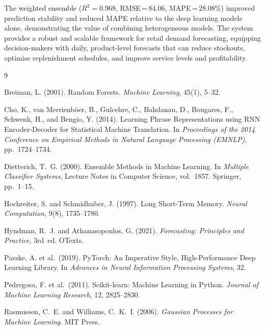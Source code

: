 \documentclass[12pt, a4paper]{article}
\begin{document}
The weighted ensemble ($R^{2} = 0.968$, RMSE\,=\,84.06, MAPE\,=\,28.08\%) improved
prediction stability and reduced MAPE relative to the deep learning models alone,
demonstrating the value of combining heterogeneous models. The system provides a robust and
scalable framework for retail demand forecasting, equipping decision-makers with daily,
product-level forecasts that can reduce stockouts, optimise replenishment schedules, and
improve service levels and profitability.

\newpage
\begin{thebibliography}{9}

Breiman, L. (2001).
Random Forests.
\textit{Machine Learning}, 45(1), 5--32.

Cho, K., van Merrienb\"{o}er, B., Gulcehre, C., Bahdanau, D., Bougares, F., Schwenk, H.,
and Bengio, Y. (2014).
Learning Phrase Representations using RNN Encoder-Decoder for Statistical Machine
Translation.
In \textit{Proceedings of the 2014 Conference on Empirical Methods in Natural Language
Processing (EMNLP)}, pp.\ 1724--1734.

Dietterich, T.~G. (2000).
Ensemble Methods in Machine Learning.
In \textit{Multiple Classifier Systems}, Lecture Notes in Computer Science, vol.\ 1857.
Springer, pp.\ 1--15.

Hochreiter, S. and Schmidhuber, J. (1997).
Long Short-Term Memory.
\textit{Neural Computation}, 9(8), 1735--1780.

Hyndman, R.~J. and Athanasopoulos, G. (2021).
\textit{Forecasting: Principles and Practice}, 3rd~ed.
OTexts.

Paszke, A. et al.\ (2019).
PyTorch: An Imperative Style, High-Performance Deep Learning Library.
In \textit{Advances in Neural Information Processing Systems}, 32.

Pedregosa, F. et al.\ (2011).
Scikit-learn: Machine Learning in Python.
\textit{Journal of Machine Learning Research}, 12, 2825--2830.

Rasmussen, C.~E. and Williams, C.~K.~I. (2006).
\textit{Gaussian Processes for Machine Learning}.
MIT Press.

\end{thebibliography}

\newpage
\appendix
\end{document}
